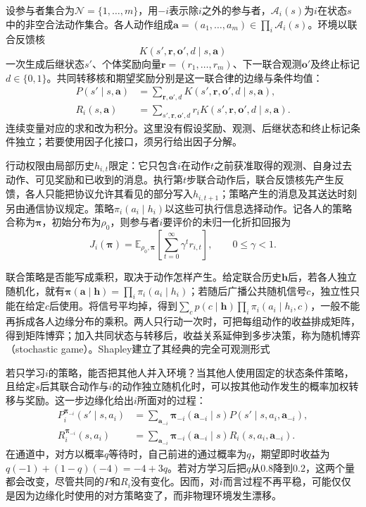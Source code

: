 \begin{definition}[多参与者序贯决策]
\label{def:rl-multi-agent-game}
设参与者集合为$\mathcal N=\{1,\ldots,m\}$，用$-i$表示除$i$之外的参与者，$\mathcal A_i(s)$为$i$在状态$s$中的非空合法动作集合。各人动作组成$\bm a=(a_1,\ldots,a_m)\in\prod_i\mathcal A_i(s)$。环境以联合反馈核
\[
 K(s',\bm r,\bm o',d\mid s,\bm a)
\]
一次生成后继状态$s'$、个体奖励向量$\bm r=(r_1,\ldots,r_m)$、下一联合观测$\bm o'$及终止标记$d\in\{0,1\}$。共同转移核和期望奖励分别是这一联合律的边缘与条件均值：
\[
 \begin{aligned}
 P(s'\mid s,\bm a)
 &=\sum_{\bm r,\bm o',d}
   K(s',\bm r,\bm o',d\mid s,\bm a),\\
 R_i(s,\bm a)
 &=\sum_{s',\bm r,\bm o',d}
   r_iK(s',\bm r,\bm o',d\mid s,\bm a).
 \end{aligned}
\]
连续变量对应的求和改为积分。这里没有假设奖励、观测、后继状态和终止标记条件独立；若要使用因子化接口，须另行给出因子分解。

行动权限由局部历史$h_{i,t}$限定：它只包含$i$在动作$t$之前获准取得的观测、自身过去动作、可见奖励和已收到的消息。执行第$t$步联合动作后，联合反馈核先产生反馈，各人只能把协议允许其看见的部分写入$h_{i,t+1}$；策略产生的消息及其送达时刻另由通信协议规定。策略$\pi_i(a_i\mid h_i)$以这些可执行信息选择动作。记各人的策略合称为$\bm\pi$，初始分布为$\rho_0$，则参与者$i$要评价的未归一化折扣回报为
\[
 J_i(\bm\pi)=\mathbb E_{\rho_0,\bm\pi}
 \left[\sum_{t=0}^{\infty}\gamma^t r_{i,t}\right],
 \qquad 0\leq\gamma<1.
\]
\end{definition}

联合策略是否能写成乘积，取决于动作怎样产生。给定联合历史$\bm h$后，若各人独立随机化，就有$\bm\pi(\bm a\mid\bm h)=\prod_i\pi_i(a_i\mid h_i)$；若随后广播公共随机信号$c$，独立性只能在给定$c$后使用。将信号平均掉，得到$\sum_c p(c\mid\bm h)\prod_i\pi_i(a_i\mid h_i,c)$，一般不能再拆成各人边缘分布的乘积。两人只行动一次时，可把每组动作的收益排成矩阵，得到矩阵博弈；加入共同状态与转移后，收益关系延伸到多步决策，称为随机博弈（stochastic game）。Shapley建立了其经典的完全可观测形式

若只学习$i$的策略，能否把其他人并入环境？当其他人使用固定的状态条件策略，且给定$s$后其联合动作与$i$的动作独立随机化时，可以按其他动作发生的概率加权转移与奖励。这一步边缘化给出$i$所面对的过程：
\begin{align}
 P_i^{\bm\pi_{-i}}(s'\mid s,a_i)
 &=\sum_{\bm a_{-i}}\bm\pi_{-i}(\bm a_{-i}\mid s)
 P(s'\mid s,a_i,\bm a_{-i}),\label{eq:rl-multi-agent-induced}\\
 R_i^{\bm\pi_{-i}}(s,a_i)
 &=\sum_{\bm a_{-i}}\bm\pi_{-i}(\bm a_{-i}\mid s)
 R_i(s,a_i,\bm a_{-i}).\nonumber
\end{align}
在通道中，对方以概率$q$等待时，自己前进的通过概率为$q$，期望即时收益为$q(-1)+(1-q)(-4)=-4+3q$。若对方学习后把$q$从$0.8$降到$0.2$，这两个量都会改变，尽管共同的$P$和$R_i$没有变化。因而，对$i$而言过程不再平稳，可能仅仅是因为边缘化时使用的对方策略变了，而非物理环境发生漂移。

